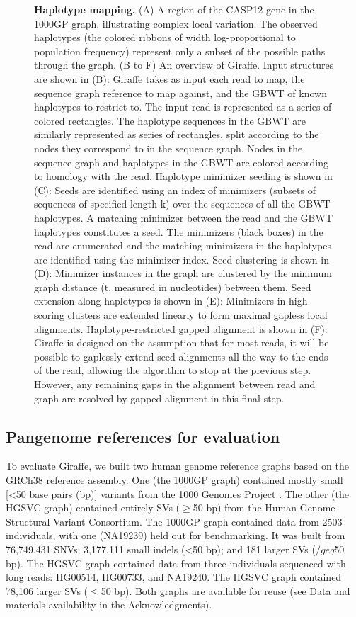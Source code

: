 \documentclass[11pt]{ucscthesis}
\begin{document}
\begin{figure}
    \caption[Haplotype mapping]{\textbf{Haplotype mapping.} (A) A region of the CASP12 gene in the 1000GP graph, illustrating complex local variation. The observed haplotypes (the colored ribbons of width log-proportional to population frequency) represent only a subset of the possible paths through the graph. (B to F) An overview of Giraffe. Input structures are shown in (B): Giraffe takes as input each read to map, the sequence graph reference to map against, and the GBWT of known haplotypes to restrict to. The input read is represented as a series of colored rectangles. The haplotype sequences in the GBWT are similarly represented as series of rectangles, split according to the nodes they correspond to in the sequence graph. Nodes in the sequence graph and haplotypes in the GBWT are colored according to homology with the read. Haplotype minimizer seeding is shown in (C): Seeds are identified using an index of minimizers (subsets of sequences of specified length k)\cite{Roberts2004} over the sequences of all the GBWT haplotypes. A matching minimizer between the read and the GBWT haplotypes constitutes a seed. The minimizers (black boxes) in the read are enumerated and the matching minimizers in the haplotypes are identified using the minimizer index. Seed clustering is shown in (D): Minimizer instances in the graph are clustered by the minimum graph distance (t, measured in nucleotides) between them\cite{chang_distance_2020}. Seed extension along haplotypes is shown in (E): Minimizers in high-scoring clusters are extended linearly to form maximal gapless local alignments. Haplotype-restricted gapped alignment is shown in (F): Giraffe is designed on the assumption that for most reads, it will be possible to gaplessly extend seed alignments all the way to the ends of the read, allowing the algorithm to stop at the previous step. However, any remaining gaps in the alignment between read and graph are resolved by gapped alignment in this final step.}
    \label{fig:aim2_fig1}
\end{figure}

\subsection{Pangenome references for evaluation}
To evaluate Giraffe, we built two human genome reference graphs based on the GRCh38 reference assembly.
One (the 1000GP graph) contained mostly small [<50 base pairs (bp)] variants from the 1000 Genomes Project \cite{1000gp_2015}.
The other (the HGSVC graph) contained entirely SVs ($\geq$50 bp) from the Human Genome Structural Variant Consortium\cite{chaisson_sv_2019}.
The 1000GP graph contained data from 2503 individuals, with one (NA19239) held out for benchmarking.
It was built from 76,749,431 SNVs; 3,177,111 small indels (<50 bp); and 181 larger SVs ($/geq$50 bp).
The HGSVC graph contained data from three individuals sequenced with long reads: HG00514, HG00733, and NA19240.
The HGSVC graph contained 78,106 larger SVs ($\leq$50 bp). Both graphs are available for reuse (see Data and materials availability in the Acknowledgments).
\end{document}
